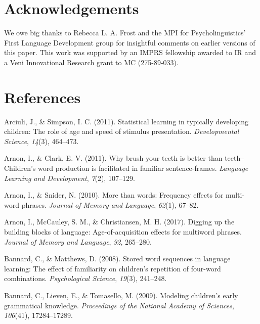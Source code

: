 \documentclass[man,mask,floatsintext]{apa6}
\begin{document}
\section{Acknowledgements}\label{acknowledgements}

We owe big thanks to Rebecca L. A. Frost and the MPI for
Psycholinguistics' First Language Development group for insightful
comments on earlier versions of this paper. This work was supported by
an IMPRS fellowship awarded to IR and a Veni Innovational Research grant
to MC (275-89-033).

\newpage

\section{References}\label{references}

\begingroup
\setlength{\parindent}{-0.5in} \setlength{\leftskip}{0.5in}

\hypertarget{refs}{}
\hypertarget{ref-arciuli2011statistical}{}
Arciuli, J., \& Simpson, I. C. (2011). Statistical learning in typically
developing children: The role of age and speed of stimulus presentation.
\emph{Developmental Science}, \emph{14}(3), 464--473.

\hypertarget{ref-arnon2011brush}{}
Arnon, I., \& Clark, E. V. (2011). Why brush your teeth is better than
teeth--Children's word production is facilitated in familiar
sentence-frames. \emph{Language Learning and Development}, \emph{7}(2),
107--129.

\hypertarget{ref-arnon2010more}{}
Arnon, I., \& Snider, N. (2010). More than words: Frequency effects for
multi-word phrases. \emph{Journal of Memory and Language}, \emph{62}(1),
67--82.

\hypertarget{ref-arnon2017}{}
Arnon, I., McCauley, S. M., \& Christiansen, M. H. (2017). Digging up
the building blocks of language: Age-of-acquisition effects for
multiword phrases. \emph{Journal of Memory and Language}, \emph{92},
265--280.

\hypertarget{ref-bannard2008stored}{}
Bannard, C., \& Matthews, D. (2008). Stored word sequences in language
learning: The effect of familiarity on children's repetition of
four-word combinations. \emph{Psychological Science}, \emph{19}(3),
241--248.

\hypertarget{ref-bannard2009modeling}{}
Bannard, C., Lieven, E., \& Tomasello, M. (2009). Modeling children's
early grammatical knowledge. \emph{Proceedings of the National Academy
of Sciences}, \emph{106}(41), 17284--17289.
\end{document}
